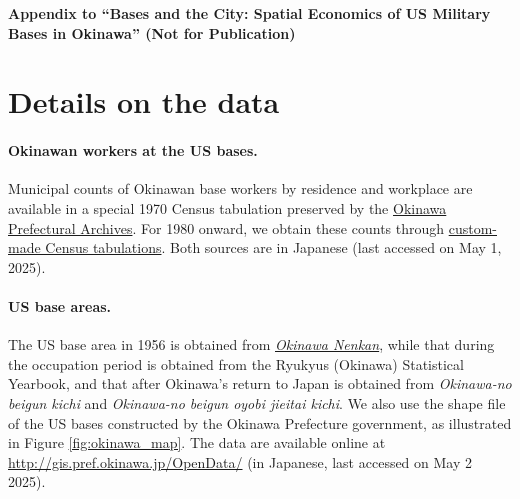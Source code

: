 \documentclass[12pt, unicode, a4paper]{article}
\newcommand{\1}{\mbox{1}\hspace{-0.25em}\mbox{l}} %
\begin{document}
{


}

\newpage 


\appendix

\renewcommand*{\thepage}{A\arabic{page}}
\def\thesection{\Alph{section}}

\setcounter{prop}{0}
\setcounter{figure}{0}


\begin{center}
    {\Large \textbf{Appendix to ``Bases and the City: Spatial Economics of US Military Bases in Okinawa''  (Not for Publication)}}
\end{center}


\startcontents[section]

\newpage 


\section{Details on the data}\label{appsec:datadetails}


\paragraph{Okinawan workers at the US bases.}

Municipal counts of Okinawan base workers by residence and workplace are available in a special 1970 Census tabulation preserved by the \href{https://www2.archives.pref.okinawa.jp/opa/OPA600_RESULT_BUNSYO.aspx?cont_cd=R00008312B}{Okinawa Prefectural Archives}. For 1980 onward, we obtain these counts through \href{https://www.e-stat.go.jp/microdata/jisseki/order/30020020240003}{custom-made Census tabulations}. Both sources are in Japanese (last accessed on May 1, 2025).

\paragraph{US base areas.}

The US base area in 1956 is obtained from \href{https://www2.archives.pref.okinawa.jp/opa/OPA600_RESULT_BUNSYO.aspx?cont_cd=T00017797B&src_keyword=&keyword_hit=&lang=jp}{\textit{Okinawa Nenkan}}, while that during the occupation period is obtained from the Ryukyus (Okinawa) Statistical Yearbook, and that after Okinawa's return to Japan is obtained from \textit{Okinawa-no beigun kichi} and \textit{Okinawa-no beigun oyobi jieitai kichi}.
We also use the shape file of the US bases constructed by the Okinawa Prefecture government, as illustrated in Figure \ref{fig:okinawa_map}. The data are available online at \url{http://gis.pref.okinawa.jp/OpenData/} (in Japanese, last accessed on May 2 2025).
\end{document}
